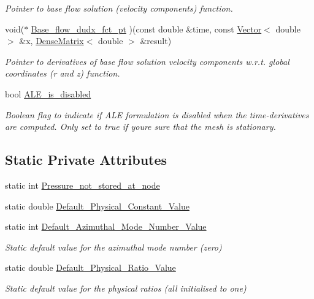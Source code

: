 \begin{DoxyCompactItemize}
\begin{DoxyCompactList}\small\item\em Pointer to base flow solution (velocity components) function. \end{DoxyCompactList}\item 
void($\ast$ \hyperlink{classoomph_1_1LinearisedAxisymmetricNavierStokesEquations_a2394ad52171080fc5c76ce8a5a2b93f6}{Base\+\_\+flow\+\_\+dudx\+\_\+fct\+\_\+pt} )(const double \&time, const \hyperlink{classoomph_1_1Vector}{Vector}$<$ double $>$ \&x, \hyperlink{classoomph_1_1DenseMatrix}{Dense\+Matrix}$<$ double $>$ \&result)
\begin{DoxyCompactList}\small\item\em Pointer to derivatives of base flow solution velocity components w.\+r.\+t. global coordinates (r and z) function. \end{DoxyCompactList}\item 
bool \hyperlink{classoomph_1_1LinearisedAxisymmetricNavierStokesEquations_a7bd074159223ffae0b106db776b670eb}{A\+L\+E\+\_\+is\+\_\+disabled}
\begin{DoxyCompactList}\small\item\em Boolean flag to indicate if A\+LE formulation is disabled when the time-\/derivatives are computed. Only set to true if you\textquotesingle{}re sure that the mesh is stationary. \end{DoxyCompactList}\end{DoxyCompactItemize}
\subsection*{Static Private Attributes}
\begin{DoxyCompactItemize}
\item 
static int \hyperlink{classoomph_1_1LinearisedAxisymmetricNavierStokesEquations_a75c0c0e335f34dc3f95442449761e470}{Pressure\+\_\+not\+\_\+stored\+\_\+at\+\_\+node}
\item 
static double \hyperlink{classoomph_1_1LinearisedAxisymmetricNavierStokesEquations_afaaef19a57850fc85a51a8d8b414dbce}{Default\+\_\+\+Physical\+\_\+\+Constant\+\_\+\+Value}
\item 
static int \hyperlink{classoomph_1_1LinearisedAxisymmetricNavierStokesEquations_a4d2cd5932b350fb5305174489aa094dc}{Default\+\_\+\+Azimuthal\+\_\+\+Mode\+\_\+\+Number\+\_\+\+Value}
\begin{DoxyCompactList}\small\item\em Static default value for the azimuthal mode number (zero) \end{DoxyCompactList}\item 
static double \hyperlink{classoomph_1_1LinearisedAxisymmetricNavierStokesEquations_a72cfb6d0e56f55db2d6072a12f5dcff5}{Default\+\_\+\+Physical\+\_\+\+Ratio\+\_\+\+Value}
\begin{DoxyCompactList}\small\item\em Static default value for the physical ratios (all initialised to one) \end{DoxyCompactList}\end{DoxyCompactItemize}
